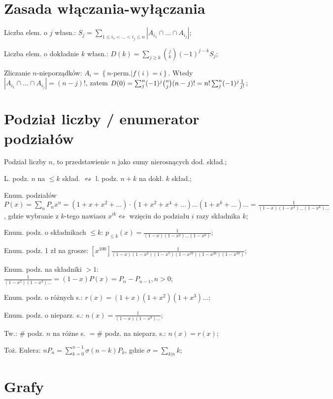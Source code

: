 \documentclass[10pt,a4paper,twocolumn]{article}
\begin{document}
\section{Zasada włączania-wyłączania}

Liczba elem. o $j$ własn.: $S_j =
  \sum_{1 \leq i_1 < \dots < i_j \leq n} |A_{i_1} \cap \dots \cap A_{i_j}|$;

Liczba elem. o dokładnie $k$ własn.:
  $D(k) = \sum_{j\geq k} \binom{j}{k} (-1)^{j-k}S_j$;

Zliczanie $n$-nieporządków: $A_i = \left\{n\text{-perm.} | f(i) = i \right\}$.
  Wtedy $|A_{i_1} \cap \dots \cap A_{i_j}| = (n-j)!$, zatem
  $D(0) = \sum^n_j(-1)^j\binom{n}{j}(n-j)!=n!\sum^n_j(-1)^j{1 \over j!}$;


\section{Podział liczby / enumerator podziałów}

Podział liczby $n$, to przedstawienie $n$ jako sumy nierosnących dod. skład.;

L. podz. $n$ na $\leq k$ skład. $\leftrightsquigarrow$
  l. podz. $n+k$ na dokł. $k$ skład.;

Enum. podziałów $P(x) = \sum_nP_nx^n =
  (1+x+x^2+\dots)\cdot(1+x^2+x^4+\dots)\dots(1+x^k+\dots)\dots =
  \frac{1}{(1-x)(1-x^2)\dots(1-x^k)\dots}$, gdzie wybranie z $k$-tego nawiasu
  $x^{ik} \leftrightsquigarrow$ wzięciu do podziału $i$ razy składnika $k$;

Enum. podz. o składnikach $\leq k$: $p_{\leq k} (x) =
  \frac{1}{(1-x)(1-x^2)\dots(1-x^k)}$;

Enum. podz. 1 zł na grosze:
  $\left [ x^{100} \right ]
  \frac{1}{(1-x)(1-x^2)(1-x^5)(1-x^{10})(1-x^{20})(1-x^{50})}$;

Enum. podz. na składniki $>1$: $\frac{1}{(1-x^2)(1-x^3)\dots}=(1-x)P(x) =
  P_n - P_{n-1}, n>0$;

Enum. podz. o różnych s.: $r(x) = (1+x)(1+x^2)(1+x^3)\dots$;

Enum. podz. o nieparz. s.: $n(x)=\frac{1}{(1-x)(1-x^3)\dots}$;

Tw.: $\#$ podz. $n$ na różne s. $= \#$ podz. na nieparz. s.: $n(x) = r(x)$;

Toż. Eulera: $nP_n = \sum_{k=0}^{n-1}\sigma(n-k)P_k$,
  gdzie $\sigma = \sum_{k|n}k$;

\section{Grafy}
\end{document}
